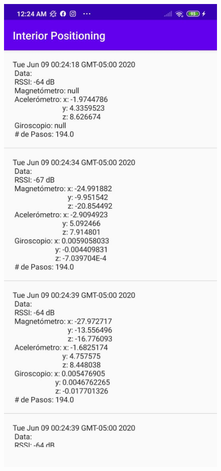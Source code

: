 \documentclass[conference,compsoc,onecolumn]{IEEEtran}
\begin{document}
\begin{figure}[H]
    \centering
    \includegraphics[scale=0.5]{bib/7.PNG}
    \label{fig:1}
\end{figure}
\end{document}
